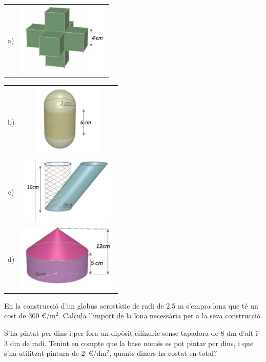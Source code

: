 \begin{activitats}
\begin{mylist}
\begin{tabular}{cc}	
a) & \includegraphics[height=3.5cm]{img-11/87a} \\
\end{tabular}


\begin{tabular}{cc}
b) & \includegraphics[height=3.5cm]{img-11/87b} \\

c) &  \includegraphics[height=3.2cm]{img-11/87c} \\

d) &  \includegraphics[height=3.2cm]{img-11/87d} \\
\end{tabular}


\exer  En la construcció d'un globus aerostàtic de radi de 2,5 m s'empra lona que té un cost de 300 \euro{}/m${}^{2}$. Calcula l'import de la lona necessària per a la seva construcció.


\exer  S'ha pintat per dins i per fora un dipòsit cilíndric sense tapadora de 8 dm d'alt i 3 dm de radi. Tenint en compte que la base només es pot pintar per dins, i que s'ha utilitzat pintura de 2~\euro{}/dm${}^{2}$, quants diners ha costat en total?


\end{mylist}
\end{activitats}
